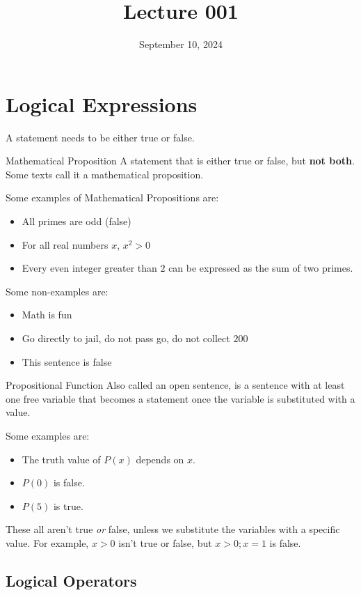 \documentclass[12pt]{article}
\title{Lecture 001}
\date{September 10, 2024}
\begin{document}
\section{Logical Expressions}
\label{sec:logicalExpressions}

A statement needs to be either true or false.

\begin{definition}{Mathematical Proposition}
  A statement that is either true or false, but \textbf{not both}. Some texts call it a
  mathematical proposition.
\end{definition}

Some examples of Mathematical Propositions are:
\begin{itemize}
  \itemsep0em
  \item All primes are odd (false)
  \item For all real numbers $x$, $x^2 > 0$
  \item Every even integer greater than $2$ can be expressed as the sum of two primes.
\end{itemize}
Some non-examples are:
\begin{itemize}
  \itemsep0em
  \item Math is fun
  \item Go directly to jail, do not pass go, do not collect \textdollar $200$
  \item This sentence is false
\end{itemize}

\begin{definition}{Propositional Function}
  Also called an open sentence, is a sentence with at least one free variable that becomes
  a statement once the variable is substituted with a value.
\end{definition}

Some examples are:
\begin{itemize}
  \itemsep0em
  \item The truth value of $P(x)$ depends on $x$.
  \item $P(0)$ is false.
  \item $P(5)$ is true.
\end{itemize}

These all aren't true \textit{or} false, unless we substitute the variables with a specific
value. For example, $x > 0$ isn't true or false, but $x > 0; x = 1$ is false.

\subsection{Logical Operators}
\label{ssec:logicalOperators}
\end{document}
